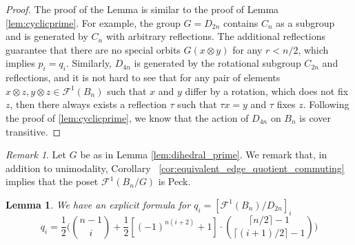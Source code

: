\documentclass{amsart}
\newtheorem{lem}[thm]{Lemma}
\theoremstyle{remark}
\newtheorem{rem}[thm]{Remark}
\begin{document}
\begin{proof}
The proof of the Lemma is similar to the proof of Lemma \ref{lem:cyclicprime}. For example, the group $G = D_{2n}$ contains $C_n$ as a subgroup and is generated by $C_n$ with arbitrary reflections. The additional reflections guarantee that there are no special orbits $G(x \otimes y)$ for any $r < n/2$, which implies $p_i = q_i$. Similarly, $D_{4n}$ is generated by the rotational subgroup $C_{2n}$ and reflections, and it is not hard to see that for any pair of elements $x \otimes z, y \otimes z \in \mathcal F^1(B_n)$ such that $x$ and $y$ differ by a rotation, which does not fix $z$, then there always exists a reflection $\tau$ such that $\tau x = y$ and $\tau$ fixes $z$. Following the proof of \ref{lem:cyclicprime}, we know that the action of $D_{4n}$ on $B_n$ is cover transitive.
\end{proof}

\begin{rem}
Let $G$ be as in Lemma \ref{lem:dihedral_prime}. We remark that, in addition to unimodality, Corollary ~\ref{cor:equivalent_edge_quotient_commuting} implies that the poset $\mathcal F^1(B_n/G)$ is Peck.
\end{rem}


\begin{lem}{\label{dihedral002}}
 We have an explicit formula for $q_i = [\mathcal F^1 (B_n)/D_{2n}]_i$
$$q_i = \frac{1}{2} \Big( {n-1 \choose i } + \frac{1}{2} [(-1)^{n(i+2)}+1] \cdot { \lceil n/2\rceil -1  \choose \lceil (i+1)/2 \rceil - 1}  \Big)$$
\end{lem}
\end{document}
